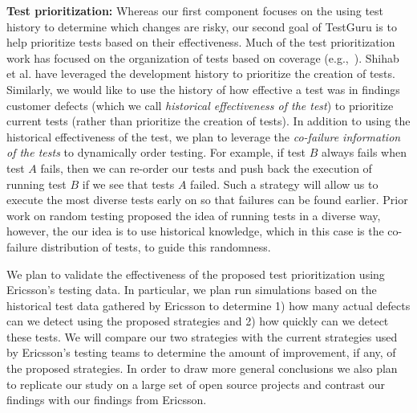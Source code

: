 \textbf{Test prioritization:} Whereas our first component focuses on the using test history to determine which changes are risky, our second goal of TestGuru is to help prioritize tests based on their effectiveness. Much of the test prioritization work has focused on the organization of tests based on coverage (e.g.,~\cite{AggrawalSEN04}).  Shihab et al. have leveraged the development history to prioritize the creation of tests. Similarly, we would like to use the history of how effective a test was in findings customer defects (which we call \emph{historical effectiveness of the test}) to prioritize current tests (rather than prioritize the creation of tests). In addition to using the historical effectiveness of the test, we plan to leverage the \emph{co-failure information of the tests} to dynamically order testing. For example, if test $B$ always fails when test $A$ fails, then we can re-order our tests and push back the execution of running test $B$ if we see that tests $A$ failed. Such a strategy will allow us to execute the most diverse tests early on so that failures can be found earlier. Prior work on random testing \cite{Duran84TSE, Arcuri2012TSE} proposed the idea of running tests in a diverse way, however, the our idea is to use historical knowledge, which in this case is the co-failure distribution of tests, to guide this randomness. 

We plan to validate the effectiveness of the proposed test prioritization using Ericsson's testing data. In particular, we plan run simulations based on the historical test data gathered by Ericsson to determine 1) how many actual defects can we detect using the proposed strategies and 2) how quickly can we detect these tests. We will compare our two strategies with the current strategies used by Ericsson's testing teams to determine the amount of improvement, if any, of the proposed strategies. In order to draw more general conclusions we also plan to replicate our study on a large set of open source projects and contrast our findings with our findings from Ericsson. 


